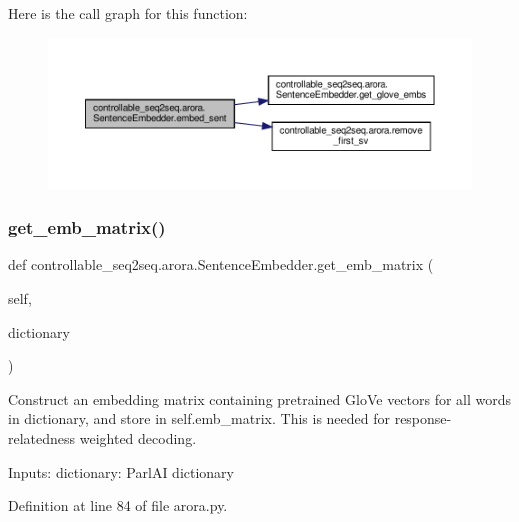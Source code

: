 Here is the call graph for this function\+:
\nopagebreak
\begin{figure}[H]
\begin{center}
\leavevmode
\includegraphics[width=350pt]{classcontrollable__seq2seq_1_1arora_1_1SentenceEmbedder_a1a24583e505d601696f51d5e5a0a3182_cgraph}
\end{center}
\end{figure}
\mbox{\label{classcontrollable__seq2seq_1_1arora_1_1SentenceEmbedder_a3fd8ad770106ea5a883df90ed4bda370}} 
\subsubsection{\texorpdfstring{get\+\_\+emb\+\_\+matrix()}{get\_emb\_matrix()}}
{\footnotesize\ttfamily def controllable\+\_\+seq2seq.\+arora.\+Sentence\+Embedder.\+get\+\_\+emb\+\_\+matrix (\begin{DoxyParamCaption}\item[{}]{self,  }\item[{}]{dictionary }\end{DoxyParamCaption})}

\begin{DoxyVerb}Construct an embedding matrix containing pretrained GloVe vectors for all words
in dictionary, and store in self.emb_matrix. This is needed for
response-relatedness weighted decoding.

Inputs:
  dictionary: ParlAI dictionary
\end{DoxyVerb}
 

Definition at line 84 of file arora.\+py.



